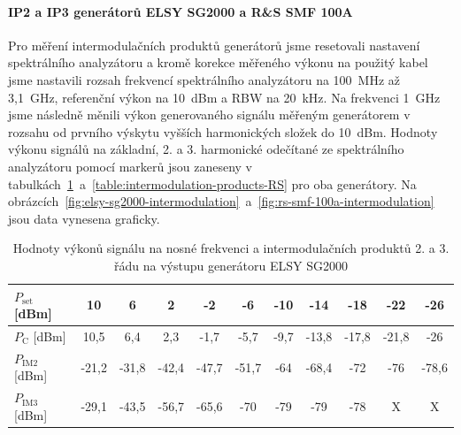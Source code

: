 \documentclass[11pt,a4paper]{article}
\begin{document}
\paragraph*{IP2 a IP3 generátorů ELSY SG2000 a R\&S SMF 100A} Pro měření intermodulačních produktů generátorů jsme resetovali nastavení spektrálního analyzátoru a kromě korekce měřeného výkonu na použitý kabel jsme nastavili rozsah frekvencí spektrálního analyzátoru na 100~MHz až 3,1~GHz, referenční výkon na 10~dBm a RBW na 20~kHz. Na frekvenci 1~GHz jsme následně měnili výkon generovaného signálu měřeným generátorem v rozsahu od prvního výskytu vyšších harmonických složek do 10~dBm. Hodnoty výkonu signálů na základní, 2. a 3. harmonické odečítané ze spektrálního analyzátoru pomocí markerů jsou zaneseny v tabulkách~\ref{table:intermodulation-products-ELSY}~a~\ref{table:intermodulation-products-RS} pro oba generátory. Na obrázcích~\ref{fig:elsy-sg2000-intermodulation}~a~\ref{fig:rs-smf-100a-intermodulation} jsou data vynesena graficky.

\begin{table}[!ht]
\begin{center}
\begin{tabular}{| l || c | c | c | c | c | c | c | c | c | c |}
    \hline
    $P_{\mathrm{set}}$ [dBm] & 10 & 6 & 2 & -2 & -6 & -10 & -14 & -18 & -22 & -26 \\
    \hline
    $P_{\mathrm{C}}$ [dBm] & 10,5 & 6,4 & 2,3 & -1,7 & -5,7 & -9,7 & -13,8 & -17,8 & -21,8 & -26 \\
    \hline
    $P_{\mathrm{IM2}}$ [dBm] & -21,2 & -31,8 & -42,4 & -47,7 & -51,7 & -64 & -68,4 & -72 & -76 & -78,6 \\
    \hline
    $P_{\mathrm{IM3}}$ [dBm] & -29,1 & -43,5 & -56,7 & -65,6 & -70 & -79 & -79 & -78 & X & X \\
    \hline
\end{tabular}
\caption{Hodnoty výkonů signálu na nosné frekvenci a intermodulačních produktů 2. a 3. řádu na výstupu generátoru ELSY SG2000}
\label{table:intermodulation-products-ELSY}
\end{center}
\end{table}
\end{document}
